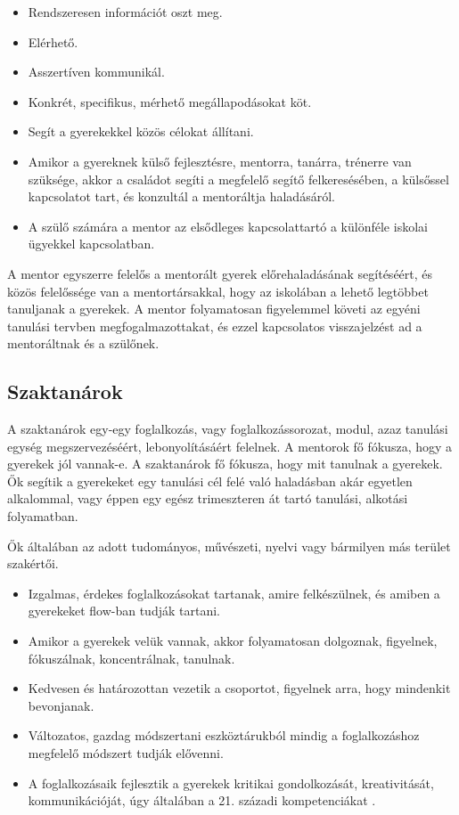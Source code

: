 \begin{itemize}
\item
  Rendszeresen információt oszt meg.
\item
  Elérhető.
\item
  Asszertíven kommunikál.
\item
  Konkrét, specifikus, mérhető megállapodásokat köt.
\item
  Segít a gyerekekkel közös célokat állítani.
\item
  Amikor a gyereknek külső fejlesztésre, mentorra, tanárra, trénerre van
  szüksége, akkor a családot segíti a megfelelő segítő felkeresésében, a
  külsőssel kapcsolatot tart, és konzultál a mentoráltja haladásáról.
\item
  A szülő számára a mentor az elsődleges kapcsolattartó a különféle
  iskolai ügyekkel kapcsolatban.
\end{itemize}

A mentor egyszerre felelős a mentorált gyerek előrehaladásának
segítéséért, és közös felelőssége van a mentortársakkal, hogy az
iskolában a lehető legtöbbet tanuljanak a gyerekek. A mentor
folyamatosan figyelemmel követi az egyéni tanulási tervben
megfogalmazottakat, és ezzel kapcsolatos visszajelzést ad a mentoráltnak
és a szülőnek.

\hypertarget{szaktanarok}{%
\subsection{Szaktanárok}\label{szaktanarok}}

A szaktanárok egy-egy foglalkozás, vagy foglalkozássorozat, modul, azaz
tanulási egység megszervezéséért, lebonyolításáért felelnek. A
mentorok fő fókusza, hogy a gyerekek jól vannak-e. A szaktanárok fő
fókusza, hogy mit tanulnak a gyerekek. Ők segítik a gyerekeket egy
tanulási cél felé való haladásban akár egyetlen alkalommal, vagy éppen
egy egész trimeszteren át tartó tanulási, alkotási folyamatban.

Ők általában az adott tudományos, művészeti, nyelvi vagy bármilyen más
terület szakértői.

\begin{itemize}
\tightlist
\item
  Izgalmas, érdekes foglalkozásokat tartanak, amire felkészülnek, és amiben a
  gyerekeket flow-ban {\autocite{Csikszentmihalyi1991}} tudják tartani.
\item
  Amikor a gyerekek velük vannak, akkor folyamatosan dolgoznak,
  figyelnek, fókuszálnak, koncentrálnak, tanulnak.
\item
  Kedvesen és határozottan vezetik a csoportot, figyelnek arra, hogy
  mindenkit bevonjanak.
\item
  Változatos, gazdag módszertani eszköztárukból mindig a foglalkozáshoz
  megfelelő módszert tudják elővenni.
\item
  A foglalkozásaik fejlesztik a gyerekek kritikai gondolkozását,
  kreativitását, kommunikációját, úgy általában a 21. századi
  kompetenciákat {\autocite{Trilling2009}}.
\end{itemize}

